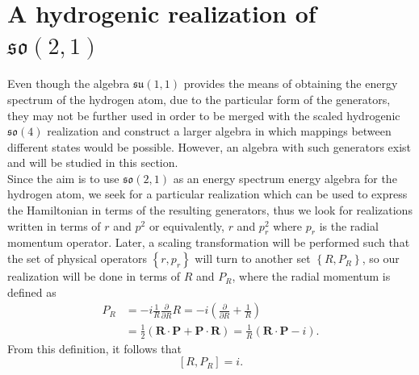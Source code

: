 \documentclass[12pt,a4paper]{report}
\theoremstyle{definition}
\theoremstyle{remark}
\theoremstyle{remark}
\begin{document}
\section{A hydrogenic realization of $\mathfrak{so}(2,1)$}
Even though the algebra $\mathfrak{su}(1,1)$ provides the means of obtaining the energy spectrum of the hydrogen atom, due to the particular form of the generators, they may not be further used in order to be merged with the scaled hydrogenic $\mathfrak{so}(4)$ realization and construct a larger algebra in which mappings between different states would be possible. However, an algebra with such generators exist and will be studied in this section. \\ \indent
Since the aim is to use $\mathfrak{so}(2,1)$ as an energy spectrum energy algebra for the hydrogen atom, we seek for a particular realization which can be used to express the Hamiltonian in terms of the resulting generators, thus we look for realizations written in terms of $r$ and $p^2$ or equivalently, $r$ and $p_r^2$ where $p_r$ is the radial momentum operator. Later, a scaling transformation will be performed such that the set of physical operators $\left\lbrace r,p_r \right\rbrace$ will turn to another set $\left\lbrace R,P_R \right\rbrace$, so our realization will be done in terms of $R$ and $P_R$, where the radial momentum is defined as \cite{messiah}
\begin{equation}\label{eso21.5}
\begin{aligned}
P_R&=-i\frac{1}{R}\frac{\partial}{\partial R}R=-i\left(\frac{\partial}{\partial R}+\frac{1}{R}\right)\\
&= \frac{1}{2}(\textbf{R}\cdot\textbf{P}+\textbf{P}\cdot\textbf{R})=\frac{1}{R}(\textbf{R}\cdot\textbf{P}-i).
\end{aligned}
\end{equation}
From this definition, it follows that
\begin{equation}\label{eso21.1}
[R,P_R]=i.
\end{equation}
\end{document}
